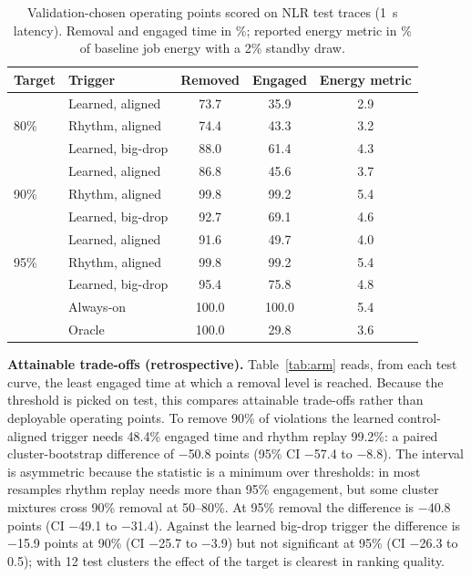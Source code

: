 \documentclass[11pt]{article}
\begin{document}
\begin{table}[t]
\centering
\caption{Validation-chosen operating points scored on NLR test traces (1~s latency). Removal and engaged
time in \%; reported energy metric in \% of baseline job energy with a 2\% standby draw.}
\label{tab:ops}
\small
\begin{tabular}{@{}llccc@{}}
\toprule
Target & Trigger & Removed & Engaged & Energy metric \\
\midrule
\multirow{3}{*}{80\%} & Learned, aligned & 73.7 & 35.9 & 2.9 \\
 & Rhythm, aligned & 74.4 & 43.3 & 3.2 \\
 & Learned, big-drop & 88.0 & 61.4 & 4.3 \\
\midrule
\multirow{3}{*}{90\%} & Learned, aligned & 86.8 & 45.6 & 3.7 \\
 & Rhythm, aligned & 99.8 & 99.2 & 5.4 \\
 & Learned, big-drop & 92.7 & 69.1 & 4.6 \\
\midrule
\multirow{3}{*}{95\%} & Learned, aligned & 91.6 & 49.7 & 4.0 \\
 & Rhythm, aligned & 99.8 & 99.2 & 5.4 \\
 & Learned, big-drop & 95.4 & 75.8 & 4.8 \\
\midrule
 & Always-on & 100.0 & 100.0 & 5.4 \\
 & Oracle & 100.0 & 29.8 & 3.6 \\
\bottomrule
\end{tabular}
\end{table}

\textbf{Attainable trade-offs (retrospective).} Table~\ref{tab:arm} reads, from each test curve, the least
engaged time at which a removal level is reached. Because the threshold is picked on test, this compares
attainable trade-offs rather than deployable operating points. To remove 90\% of violations the learned
control-aligned trigger needs 48.4\% engaged time and rhythm replay
99.2\%: a paired cluster-bootstrap difference of $-$50.8
points (95\% CI $-$57.4 to $-$8.8). The interval is
asymmetric because the statistic is a minimum over thresholds: in most resamples rhythm replay needs more
than 95\% engagement, but some cluster mixtures cross 90\% removal at 50--80\%. At 95\% removal the
difference is $-$40.8 points (CI $-$49.1 to
$-$31.4). Against the learned big-drop trigger the difference is
$-$15.9 points at 90\% (CI $-$25.7 to $-$3.9)
but not significant at 95\% (CI $-$26.3 to 0.5); with 12 test
clusters the effect of the target is clearest in ranking quality.
\end{document}
